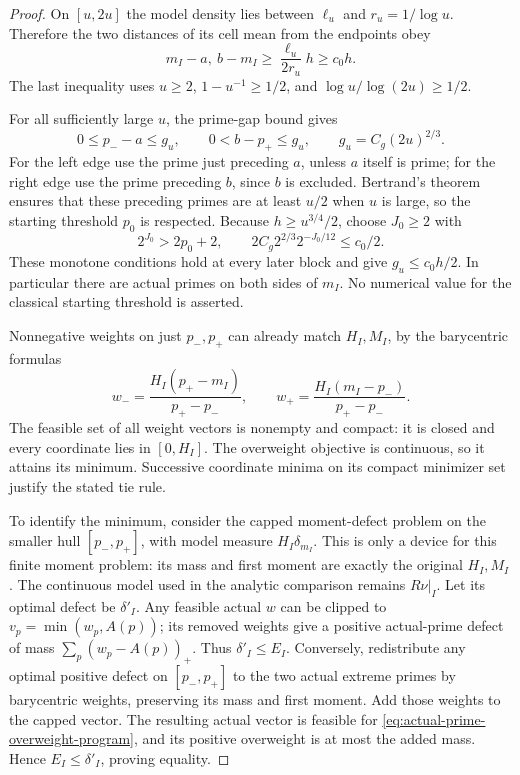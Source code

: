 \documentclass[11pt]{article}
\theoremstyle{definition}
\begin{document}
\begin{proof}
On $[u,2u]$ the model density lies between $\ell_u$ and
$r_u=1/\log u$. Therefore the two distances of its cell mean
from the endpoints obey
\[
 m_I-a,\ b-m_I\ge\frac{\ell_u}{2r_u}h\ge c_0h.
\]
The last inequality uses $u\ge2$,
$1-u^{-1}\ge1/2$, and $\log u/\log(2u)\ge1/2$.

For all sufficiently large $u$, the prime-gap bound gives
\[
 0\le p_--a\le g_u,\qquad
 0<b-p_+\le g_u,\qquad g_u=C_g(2u)^{2/3}.
\]
For the left edge use the prime just preceding $a$, unless
$a$ itself is prime; for the right edge use the prime preceding
$b$, since $b$ is excluded. Bertrand's theorem ensures that
these preceding primes are at least $u/2$ when $u$ is large,
so the starting threshold $p_0$ is respected.
Because $h\ge u^{3/4}/2$, choose $J_0\ge2$ with
\[
 2^{J_0}>2p_0+2,\qquad
 2C_g2^{2/3}2^{-J_0/12}\le c_0/2.
\]
These monotone conditions hold at every later block and give
$g_u\le c_0h/2$. In particular there are actual primes on both
sides of $m_I$. No numerical value for the classical starting
threshold is asserted.

Nonnegative weights on just $p_-,p_+$ can already match
$H_I,M_I$, by the barycentric formulas
\[
 w_-=\frac{H_I(p_+-m_I)}{p_+-p_-},\qquad
 w_+=\frac{H_I(m_I-p_-)}{p_+-p_-}.
\]
The feasible set of all weight vectors is nonempty and compact:
it is closed and every coordinate lies in $[0,H_I]$.
The overweight objective is continuous, so it attains its
minimum. Successive coordinate minima on its compact minimizer
set justify the stated tie rule.

To identify the minimum, consider the capped moment-defect
problem on the smaller hull $[p_-,p_+]$, with model measure
$H_I\delta_{m_I}$. This is only a device for this finite
moment problem: its mass and first moment are exactly the
original $H_I,M_I$. The continuous model used in the analytic
comparison remains $R\nu|_I$.
Let its optimal defect be $\delta'_I$.
Any feasible actual $w$ can be clipped to
$v_p=\min(w_p,A(p))$; its removed weights give a positive
actual-prime defect of mass $\sum_p(w_p-A(p))_+$.
Thus $\delta'_I\le E_I$.
Conversely, redistribute any optimal positive defect on
$[p_-,p_+]$ to the two actual extreme primes by barycentric
weights, preserving its mass and first moment. Add those
weights to the capped vector. The resulting actual vector
is feasible for \eqref{eq:actual-prime-overweight-program},
and its positive overweight is at most the added mass.
Hence $E_I\le\delta'_I$, proving equality.


\end{proof}
\end{document}
